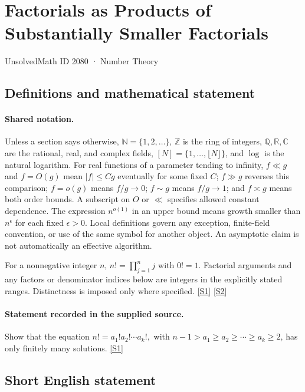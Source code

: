 \documentclass[11pt,a4paper]{article}
\newcommand{\N}{\mathbb{N}}
\newcommand{\Z}{\mathbb{Z}}
\newcommand{\Q}{\mathbb{Q}}
\newcommand{\R}{\mathbb{R}}
\newcommand{\C}{\mathbb{C}}
\newcommand{\sref}[2]{\hyperlink{source:#1:#2}{[S#2]}}
\begin{document}

\setcounter{section}{2079}

\section{Factorials as Products of Substantially Smaller Factorials}\label{2080}

{\small\sffamily UnsolvedMath ID 2080 · Number Theory}

\subsection{Definitions and mathematical statement}

\paragraph{Shared notation.}Unless a section says otherwise, $\N=\{1,2,\ldots\}$,
$\Z$ is the ring of integers, $\Q,\R,\C$ are the rational, real, and complex
fields, $[N]=\{1,\ldots,\lfloor N\rfloor\}$, and $\log$ is the natural
logarithm. For real functions of a parameter tending to infinity,
$f\ll g$ and $f=O(g)$ mean $|f|\leq Cg$ eventually for some fixed $C$;
$f\gg g$ reverses this comparison; $f=o(g)$ means $f/g\to0$;
$f\sim g$ means $f/g\to1$; and $f\asymp g$ means both order bounds.
A subscript on $O$ or $\ll$ specifies allowed constant dependence.
The expression $n^{o(1)}$ in an upper bound means growth smaller than
$n^\epsilon$ for each fixed $\epsilon>0$. Local definitions govern any
exception, finite-field convention, or use of the same symbol for another
object. An asymptotic claim is not automatically an effective algorithm.



For a nonnegative integer $n$, $n!=\prod_{j=1}^n j$ with $0!=1$. Factorial arguments and any factors or denominator indices below are integers in the explicitly stated ranges. Distinctness is imposed only where specified. \sref{2080}{1} \sref{2080}{2}

\paragraph{Statement recorded in the supplied source.}
Show that the equation $ n! = a_1!a_2!\cdots a_k!, $ with $n-1>a_1\geq a_2\geq \cdots \geq a_k\geq 2$, has only finitely many solutions. \sref{2080}{1}

\subsection{Short English statement}
\end{document}
